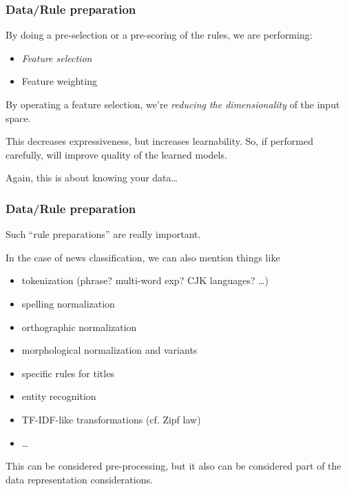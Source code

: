 \documentclass[usenames,dvipsnames]{beamer}
\newcommand{\x}{\mathbf{x}}
\newcommand{\y}{\mathbf{y}}
\newcommand{\voc}[1]{\emph{\color{ForestGreen}#1}}
\begin{document}
\begin{frame}\frametitle{Data/Rule preparation}

By doing a pre-selection or a pre-scoring of the rules, we are performing:
\begin{itemize}
\item \voc{Feature selection}
\item Feature weighting
\end{itemize}

\vspace{0.4cm}
By operating a feature selection, we're \voc{reducing the dimensionality} of
the input space.

This decreases expressiveness, but increases learnability.  So, if
performed carefully, will improve quality of the learned models.

\vspace{0.4cm}
Again, this is about knowing your data\ldots

\end{frame}


\begin{frame}\frametitle{Data/Rule preparation}

Such ``rule preparations'' are really important.

In the case of news classification, we can also mention things like
\begin{itemize}
\item tokenization (phrase?  multi-word exp?  CJK languages? \ldots)
\item spelling normalization
\item orthographic normalization
\item morphological normalization and variants
\item specific rules for titles
\item entity recognition
\item TF-IDF-like transformations (cf. Zipf law)
\item \ldots
\end{itemize}

\vspace{0.4cm}
This can be considered pre-processing, but it also can be considered
part of the data representation considerations.

\end{frame}


\end{document}

